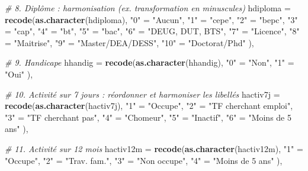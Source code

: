 \documentclass[
]{article}
\newenvironment{Shaded}{\begin{snugshade}}{\end{snugshade}}
\newcommand{\AttributeTok}[1]{\textcolor[rgb]{0.13,0.29,0.53}{#1}}
\newcommand{\CommentTok}[1]{\textcolor[rgb]{0.56,0.35,0.01}{\textit{#1}}}
\newcommand{\FunctionTok}[1]{\textcolor[rgb]{0.13,0.29,0.53}{\textbf{#1}}}
\newcommand{\NormalTok}[1]{#1}
\newcommand{\OtherTok}[1]{\textcolor[rgb]{0.56,0.35,0.01}{#1}}
\newcommand{\StringTok}[1]{\textcolor[rgb]{0.31,0.60,0.02}{#1}}
\begin{document}
\begin{Shaded}
\begin{Highlighting}[]
    \CommentTok{\# 8. Diplôme : harmonisation (ex. transformation en minuscules)}
    \AttributeTok{hdiploma =} \FunctionTok{recode}\NormalTok{(}\FunctionTok{as.character}\NormalTok{(hdiploma),}
      \StringTok{"0"}  \OtherTok{=} \StringTok{"Aucun"}\NormalTok{,}
      \StringTok{"1"}  \OtherTok{=} \StringTok{"cepe"}\NormalTok{,}
      \StringTok{"2"}  \OtherTok{=} \StringTok{"bepc"}\NormalTok{,}
      \StringTok{"3"}  \OtherTok{=} \StringTok{"cap"}\NormalTok{,}
      \StringTok{"4"}  \OtherTok{=} \StringTok{"bt"}\NormalTok{,}
      \StringTok{"5"}  \OtherTok{=} \StringTok{"bac"}\NormalTok{,}
      \StringTok{"6"}  \OtherTok{=} \StringTok{"DEUG, DUT, BTS"}\NormalTok{,}
      \StringTok{"7"}  \OtherTok{=} \StringTok{"Licence"}\NormalTok{,}
      \StringTok{"8"}  \OtherTok{=} \StringTok{"Maitrise"}\NormalTok{,}
      \StringTok{"9"}  \OtherTok{=} \StringTok{"Master/DEA/DESS"}\NormalTok{,}
      \StringTok{"10"} \OtherTok{=} \StringTok{"Doctorat/Phd"}
\NormalTok{    ),}
    
    \CommentTok{\# 9. Handicape}
    \AttributeTok{hhandig =} \FunctionTok{recode}\NormalTok{(}\FunctionTok{as.character}\NormalTok{(hhandig),}
      \StringTok{"0"} \OtherTok{=} \StringTok{"Non"}\NormalTok{,}
      \StringTok{"1"} \OtherTok{=} \StringTok{"Oui"}
\NormalTok{    ),}
    
    \CommentTok{\# 10. Activité sur 7 jours : réordonner et harmoniser les libellés}
    \AttributeTok{hactiv7j =} \FunctionTok{recode}\NormalTok{(}\FunctionTok{as.character}\NormalTok{(hactiv7j),}
      \StringTok{"1"} \OtherTok{=} \StringTok{"Occupe"}\NormalTok{,}
      \StringTok{"2"} \OtherTok{=} \StringTok{"TF cherchant emploi"}\NormalTok{,}
      \StringTok{"3"} \OtherTok{=} \StringTok{"TF cherchant pas"}\NormalTok{,}
      \StringTok{"4"} \OtherTok{=} \StringTok{"Chomeur"}\NormalTok{,}
      \StringTok{"5"} \OtherTok{=} \StringTok{"Inactif"}\NormalTok{,}
      \StringTok{"6"} \OtherTok{=} \StringTok{"Moins de 5 ans"}
\NormalTok{    ),}
    
    \CommentTok{\# 11. Activité sur 12 mois}
    \AttributeTok{hactiv12m =} \FunctionTok{recode}\NormalTok{(}\FunctionTok{as.character}\NormalTok{(hactiv12m),}
      \StringTok{"1"} \OtherTok{=} \StringTok{"Occupe"}\NormalTok{,}
      \StringTok{"2"} \OtherTok{=} \StringTok{"Trav. fam."}\NormalTok{,}
      \StringTok{"3"} \OtherTok{=} \StringTok{"Non occupe"}\NormalTok{,}
      \StringTok{"4"} \OtherTok{=} \StringTok{"Moins de 5 ans"}
\NormalTok{    ),}
    

\end{Highlighting}
\end{Shaded}
\end{document}
